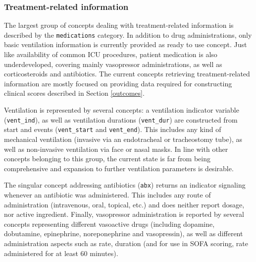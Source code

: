 \documentclass[
]{jss}
\begin{document}
\hypertarget{treatment-related-information}{%
\subsubsection{Treatment-related
information}\label{treatment-related-information}}

The largest group of concepts dealing with treatment-related information
is described by the \texttt{medications} category. In addition to drug
administrations, only basic ventilation information is currently
provided as ready to use concept. Just like availability of common ICU
procedures, patient medication is also underdeveloped, covering mainly
vasopressor administrations, as well as corticosteroids and antibiotics.
The current concepts retrieving treatment-related information are mostly
focused on providing data required for constructing clinical scores
described in Section \ref{outcomes}.

Ventilation is represented by several concepts: a ventilation indicator
variable (\texttt{vent\_ind}), as well as ventilation durations
(\texttt{vent\_dur}) are constructed from start and events
(\texttt{vent\_start} and \texttt{vent\_end}). This includes any kind of
mechanical ventilation (invasive via an endotracheal or tracheostomy
tube), as well as non-invasive ventilation via face or nasal masks. In
line with other concepts belonging to this group, the current state is
far from being comprehensive and expansion to further ventilation
parameters is desirable.

The singular concept addressing antibiotics (\texttt{abx}) returns an
indicator signaling whenever an antibiotic was administered. This
includes any route of administration (intravenous, oral, topical, etc.)
and does neither report dosage, nor active ingredient. Finally,
vasopressor administration is reported by several concepts representing
different vasoactive drugs (including dopamine, dobutamine, epinephrine,
noreponephrine and vasopressin), as well as different administration
aspects such as rate, duration (and for use in SOFA scoring, rate
administered for at least 60 minutes).
\end{document}
